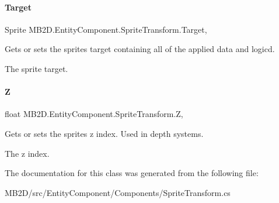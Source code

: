 \paragraph{\texorpdfstring{Target}{Target}}
{\footnotesize\ttfamily Sprite M\+B2\+D.\+Entity\+Component.\+Sprite\+Transform.\+Target\hspace{0.3cm}{\ttfamily [get]}, {\ttfamily [set]}}



Gets or sets the sprites target containing all of the applied data and logicd. 

The sprite target.\hypertarget{class_m_b2_d_1_1_entity_component_1_1_sprite_transform_a312bac0f6e60d258adce879f4d3da2e7}{}\label{class_m_b2_d_1_1_entity_component_1_1_sprite_transform_a312bac0f6e60d258adce879f4d3da2e7} 
\paragraph{\texorpdfstring{Z}{Z}}
{\footnotesize\ttfamily float M\+B2\+D.\+Entity\+Component.\+Sprite\+Transform.\+Z\hspace{0.3cm}{\ttfamily [get]}, {\ttfamily [set]}}



Gets or sets the sprites z index. Used in depth systems. 

The z index.

The documentation for this class was generated from the following file\+:\begin{DoxyCompactItemize}
\item 
M\+B2\+D/src/\+Entity\+Component/\+Components/Sprite\+Transform.\+cs\end{DoxyCompactItemize}

